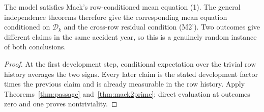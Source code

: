 \begin{theorem}\label{thm:independenceWitnessPassage}\leanok
{}
The model satisfies Mack's row-conditioned mean equation (1). The general independence theorems
therefore give the corresponding mean equation conditioned on $\mathcal{D}_k$ and the cross-row
residual condition (M2'). Two outcomes give different claims in the same accident year, so this is
a genuinely random instance of both conclusions.
\end{theorem}
\begin{proof}\leanok At the first development step, conditional expectation over the trivial row
history averages the two signs. Every later claim is the stated development factor times the
previous claim and is already measurable in the row history. Apply
Theorems~\ref{thm:passage} and~\ref{thm:mack2prime}; direct evaluation at outcomes zero and one
proves nontriviality.
\end{proof}

